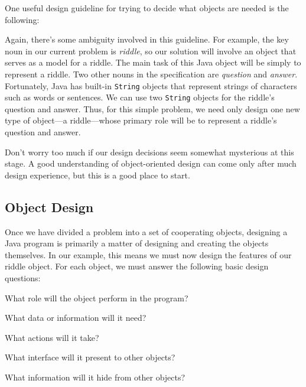 One useful design guideline for trying to decide what objects
are needed is the following:


\noindent Again, there's some ambiguity involved in this guideline.
For example, the key noun in our current problem is {\it riddle}, so
our solution will involve an object that serves as a model for a
riddle.  The main task of this Java object will be simply to represent
a riddle. Two other nouns in the specification are {\it question} and
{\it answer}. Fortunately, Java has built-in {\tt String} objects that
represent strings of characters such as words or sentences. We can use
two {\tt String} objects for the riddle's question and answer.  Thus,
for this simple problem, we need only design one new type of
object---a riddle---whose primary role will be to represent a riddle's
question and answer.

Don't worry too much if our design decisions seem somewhat mysterious
at this stage. A good understanding of object-oriented design can come
only after much design experience, but this is a good place to start.

\subsection{Object Design}

\noindent Once we have divided a problem into a set of cooperating 
objects, designing a Java program is primarily a matter of designing
and creating the objects themselves. In our example, this means we
must now design the features of our riddle object.  For each object,
we must answer the following basic design questions:

\begin{BL}
\item What role will the object perform in the program?
\vspace{2pt}\item What data or information will it need?
\vspace{2pt}\item What actions will it take?
\vspace{2pt}\item What interface will it present to other objects?
\vspace{2pt}\item What information will it hide from other objects?
\end{BL}

